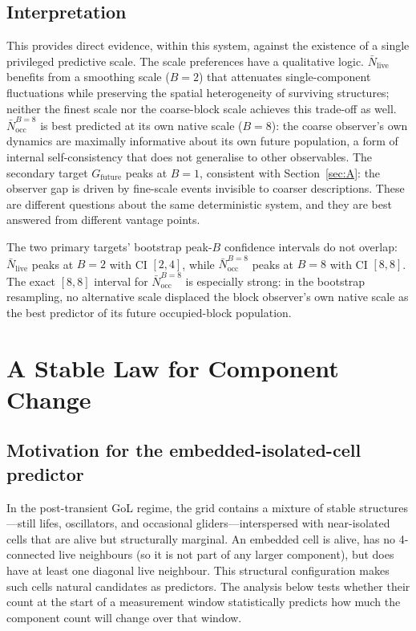 \documentclass[11pt,a4paper]{article}
\newcommand{\Nlive}{\bar{N}_{\mathrm{live}}}
\newcommand{\Nocc}{\bar{N}^{B=8}_{\mathrm{occ}}}
\newcommand{\Gfut}{G_{\mathrm{future}}}
\begin{document}
\subsection{Interpretation}

This provides direct evidence, within this system, against the existence of
a single privileged predictive scale.
The scale preferences have a qualitative logic.
$\Nlive$ benefits from a smoothing scale ($B=2$) that attenuates
single-component fluctuations while preserving the spatial heterogeneity of
surviving structures; neither the finest scale nor the coarse-block scale
achieves this trade-off as well.
$\Nocc$ is best predicted at its own native scale ($B=8$): the coarse
observer's own dynamics are maximally informative about its own future
population, a form of internal self-consistency that does not generalise to
other observables.
The secondary target $\Gfut$ peaks at $B=1$, consistent with
Section~\ref{sec:A}: the observer gap is driven by fine-scale events
invisible to coarser descriptions.
These are different questions about the same deterministic system, and they
are best answered from different vantage points.

The two primary targets' bootstrap peak-$B$ confidence intervals do not
overlap: $\Nlive$ peaks at $B=2$ with CI $[2,4]$, while $\Nocc$ peaks at
$B=8$ with CI $[8,8]$.
The exact $[8,8]$ interval for $\Nocc$ is especially strong: in the bootstrap
resampling, no alternative scale displaced the block observer's own native
scale as the best predictor of its future occupied-block population.

\section{A Stable Law for Component Change}
\label{sec:D}

\subsection{Motivation for the embedded-isolated-cell predictor}

In the post-transient GoL regime, the grid contains a mixture of stable
structures---still lifes, oscillators, and occasional gliders---interspersed
with near-isolated cells that are alive but structurally marginal.
An embedded cell is alive, has no 4-connected live neighbours (so it is not
part of any larger component), but does have at least one diagonal live
neighbour.
This structural configuration makes such cells natural candidates as
predictors.
The analysis below tests whether their count at the start of a measurement
window statistically predicts how much the component count will change over
that window.
\end{document}
